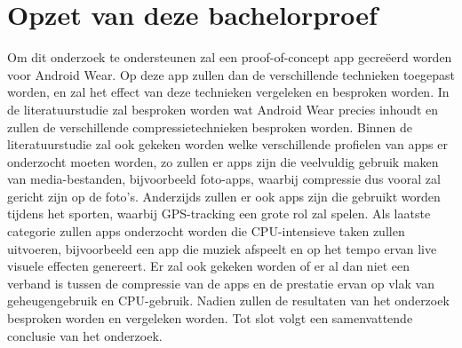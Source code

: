\section{Opzet van deze bachelorproef}
\label{sec:opzet-bachelorproef}





Om dit onderzoek te ondersteunen zal een proof-of-concept app gecreëerd worden voor Android Wear. Op deze app zullen dan de verschillende technieken toegepast worden, en zal het effect van deze technieken vergeleken en besproken worden. In de literatuurstudie zal besproken worden wat Android Wear precies inhoudt en zullen de verschillende compressietechnieken besproken worden. Binnen de literatuurstudie zal ook gekeken worden welke verschillende profielen van apps er onderzocht moeten worden, zo zullen er apps zijn die veelvuldig gebruik maken van media-bestanden, bijvoorbeeld foto-apps, waarbij compressie dus vooral zal gericht zijn op de foto's. Anderzijds zullen er ook apps zijn die gebruikt worden tijdens het sporten, waarbij GPS-tracking een grote rol zal spelen. Als laatste categorie zullen apps onderzocht worden die CPU-intensieve taken zullen uitvoeren, bijvoorbeeld een app die muziek afspeelt en op het tempo ervan live visuele effecten genereert. Er zal ook gekeken worden of er al dan niet een verband is tussen de compressie van de apps en de prestatie ervan op vlak van geheugengebruik en CPU-gebruik. Nadien zullen de resultaten van het onderzoek besproken worden en vergeleken worden. Tot slot volgt een samenvattende conclusie van het onderzoek. 


